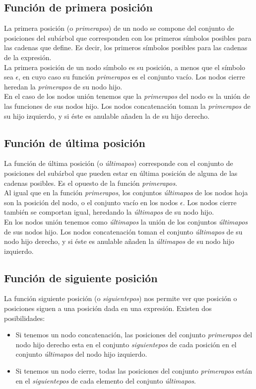 \subsection{Función de primera posición}
La primera posición (o \emph{primerapos}) de un nodo se compone del conjunto de posiciones del subárbol que corresponden con los primeros símbolos posibles para las cadenas que define.
Es decir, los primeros símbolos posibles para las cadenas de la expresión.
\\
La primera posición de un nodo símbolo es su posición, a menos que el símbolo sea $ \epsilon $, en cuyo caso su función \emph{primerapos} es el conjunto vacío.
Los nodos cierre heredan la \emph{primerapos} de su nodo hijo.
\\
En el caso de los nodos unión tenemos que la \emph{primerapos} del nodo es la unión de las funciones de sus nodos hijo.
Los nodos concatenación toman la \emph{primerapos} de su hijo izquierdo, y si éste es anulable añaden la de su hijo derecho.

\subsection{Función de última posición}
La función de última posición (o \emph{últimapos}) corresponde con el conjunto de posiciones del subárbol que pueden estar en última posición de alguna de las cadenas posibles.
Es el opuesto de la función \emph{primerapos}.
\\
Al igual que en la función \emph{primerapos}, los conjuntos \emph{últimapos} de los nodos hoja son la posición del nodo, o el conjunto vacío en los nodos $ \epsilon $.
Los nodos cierre también se comportan igual, heredando la \emph{últimapos} de su nodo hijo.
\\
En los nodos unión tenemos como \emph{últimapos} la unión de los conjuntos \emph{últimapos} de sus nodos hijo.
Los nodos concatenación toman el conjunto \emph{últimapos} de su nodo hijo derecho, y si éste es anulable añaden la \emph{últimapos} de su nodo hijo izquierdo.

\subsection{Función de siguiente posición}
La función siguiente posición (o \emph{siguientepos}) nos permite ver que posición o posiciones siguen a una posición dada en una expresión.
Existen dos posibilidades:
\begin{itemize}
	\item Si tenemos un nodo concatenación, las posiciones del conjunto \emph{primerapos} del nodo hijo derecho esta en el conjunto \emph{siguientepos} de cada posición en el conjunto \emph{últimapos} del nodo hijo izquierdo.
	\item Si tenemos un nodo cierre, todas las posiciones del conjunto \emph{primerapos} están en el \emph{siguientepos} de cada elemento del conjunto \emph{últimapos}.
\end{itemize}

